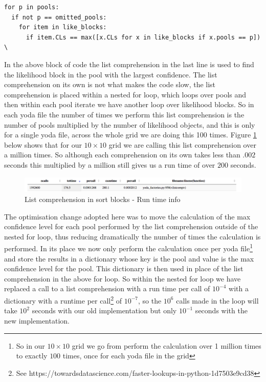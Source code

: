 \begin{verbatim}
for p in pools:
  if not p == omitted_pools:
    for item in like_blocks:
      if item.CLs == max([x.CLs for x in like_blocks if x.pools == p]) \
\end{verbatim}

In the above block of code the list comprehension in the last line is used to find the likelihood block in the pool with the largest confidence. The list comprehension on its own is not what makes the code slow, the list comprehension is placed within a nested for loop, which loops over pools and then within each pool iterate we have another loop over likelihood blocks. So in each yoda file the number of times we perform this list comprehension is the number of pools multiplied by the number of likelihood objects, and this is only for a single yoda file, across the whole grid we are doing this 100 times. Figure \ref{fig:list_comprehension} below shows that for our $10\times 10$ grid we are calling this list comprehension over a million times. So although each comprehension on its own takes less than $.002$ seconds this multiplied by a million still gives us a run time of over $200$ seconds.  

\begin{figure}[H]
\centering
\includegraphics[scale=0.3]{plots/sort_blocks_list_comprehension.png}
\caption{List comprehension in sort blocks - Run time info}
\label{fig:list_comprehension}
\end{figure}

The optimisation change adopted here was to move the calculation of the max confidence level for each pool performed by the list comprehension outside of the nested for loop, thus reducing dramatically the number of times the calculation is performed. In its place we now only perform the calculation once per yoda file\footnote{So in our $10\times 10$  grid we go from perform the calculation over 1 million times to exactly $100$ times, once for each yoda file in the grid} and store the results in a dictionary whose key is the pool and value is the max confidence level for the pool. This dictionary is then used in place of the list comprehension in the above for loop. So within the nested for loop we have replaced a call to a list comprehension with a run time per call of $10^{-4}$ with a dictionary with a runtime per call\footnote{See https://towardsdatascience.com/faster-lookups-in-python-1d7503e9cd38} of $10^{-7}$, so the $10^6$ calls made in the loop will take $10^2$ seconds with our old implementation but only $10^{-1}$ seconds with the new implementation.

